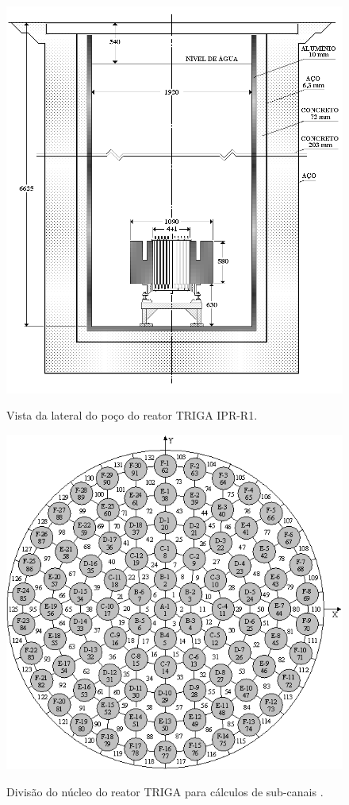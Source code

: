 \begin{figure}[htb]
  \caption{Vista da lateral do poço do reator TRIGA IPR-R1.}
  \centering\includegraphics[scale=0.35]{figuras/poco_triga.png}
  \label{fig:poco_triga}
\end{figure}

\begin{figure}[htb]
  \caption{Divisão do núcleo do reator TRIGA para cálculos de sub-canais \cite{Veloso2005}.}
  \centering\includegraphics[scale=0.6]{figuras/subcanais_veloso.png}
  \label{fig:subcanais_veloso}
\end{figure}


